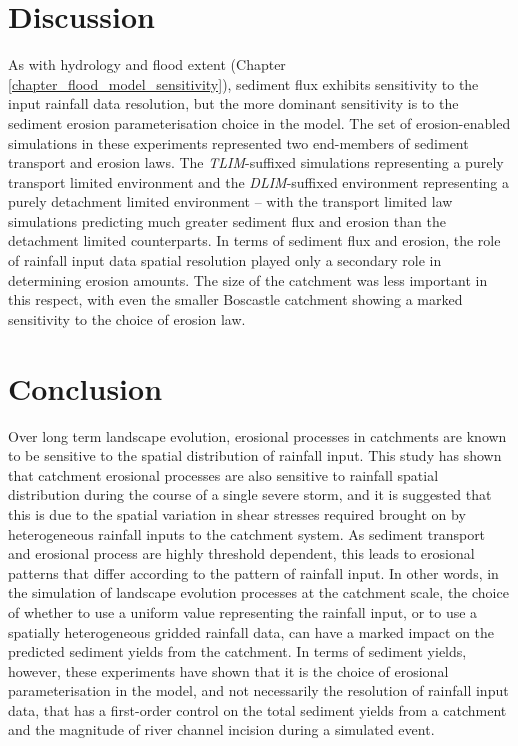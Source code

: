 \section{Discussion}

As with hydrology and flood extent (Chapter \ref{chapter_flood_model_sensitivity}), sediment flux exhibits sensitivity to the input rainfall data resolution, but the more dominant sensitivity is to the sediment erosion parameterisation choice in the model. The set of erosion-enabled simulations in these experiments represented two end-members of sediment transport and erosion laws. The \textit{TLIM}-suffixed simulations representing a purely transport limited environment and the \textit{DLIM}-suffixed environment representing a purely detachment limited environment -- with the transport limited law simulations predicting much greater sediment flux and erosion than the detachment limited counterparts. In terms of sediment flux and erosion, the role of rainfall input data spatial resolution played only a secondary role in determining erosion amounts. The size of the catchment was less important in this respect, with even the smaller Boscastle catchment showing a marked sensitivity to the choice of erosion law.

\section{Conclusion}
Over long term landscape evolution, erosional processes in catchments are known to be sensitive to the spatial distribution of rainfall input.  This study has shown that catchment erosional processes are also sensitive to rainfall spatial distribution during the course of a single severe storm, and it is suggested that this is due to the spatial variation in shear stresses required brought on by heterogeneous rainfall inputs to the catchment system.  As sediment transport and erosional process are highly threshold dependent, this leads to erosional patterns that differ according to the pattern of rainfall input. In other words, in the simulation of landscape evolution processes at the catchment scale, the choice of whether to use a uniform value representing the rainfall input, or to use a spatially heterogeneous gridded rainfall data, can have a marked impact on the predicted sediment yields from the catchment. 
In terms of sediment yields, however, these experiments have shown that it is the choice of erosional parameterisation in the model, and not necessarily the resolution of rainfall input data, that has a first-order control on the total sediment yields from a catchment and the magnitude of river channel incision during a simulated event.

